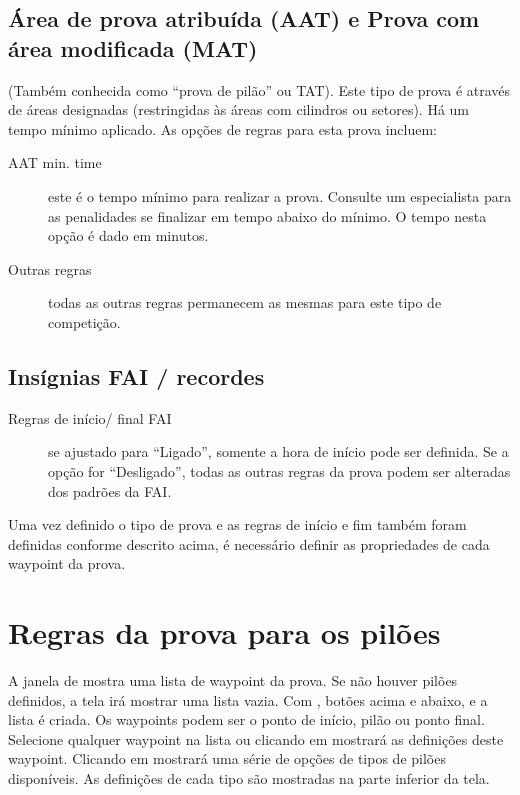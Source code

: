 \subsection*{Área de prova atribuída (AAT) e Prova com área modificada (MAT)}
(Também conhecida como “prova de pilão” ou TAT).  Este tipo de prova é através de áreas designadas (restringidas às áreas com cilindros ou setores).  Há um tempo mínimo aplicado.  As opções de regras para esta prova incluem:
  \begin{description}
  \item [AAT min. time]  este é o tempo mínimo para realizar a prova. Consulte um especialista para as penalidades se finalizar em tempo abaixo do mínimo.  O tempo nesta opção é dado em minutos.
  \item [Outras regras] todas as outras regras permanecem as mesmas para este tipo de competição.
  \end{description}


\subsection*{Insígnias FAI / recordes}
  \begin{description}
  \item [Regras de início/ final FAI] se ajustado para “Ligado”, somente a hora de início pode ser definida.  Se a opção for “Desligado”, todas as outras regras da prova podem ser alteradas dos padrões da FAI.
  \end{description}

Uma vez definido o tipo de prova e as regras de início e fim também foram definidas conforme descrito acima, é necessário definir as propriedades de cada waypoint da prova.

\section{Regras da prova para os pilões}\label{sec:task-rules}

A janela de  mostra uma lista de waypoint da prova. 
 Se não houver pilões definidos, a tela irá mostrar uma lista vazia.  Com , botões acima e abaixo, e  a lista é criada.  Os waypoints podem ser o ponto de início, pilão ou ponto final.  Selecione qualquer waypoint na lista ou clicando em  mostrará as definições deste waypoint.  Clicando em  mostrará uma série de opções de tipos de pilões disponíveis.  As definições de cada tipo são mostradas na parte inferior da tela.

